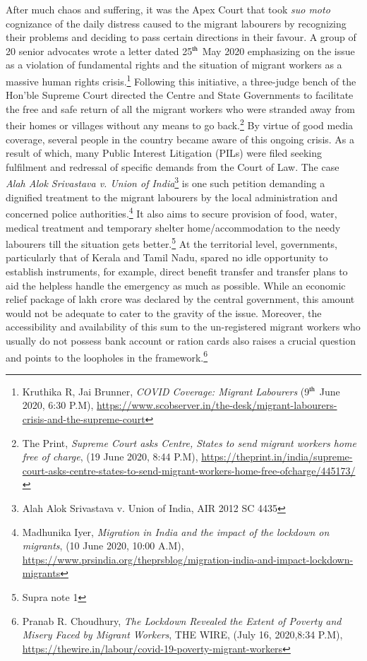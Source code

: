 \begin{multicols}{2}
\noi
After much chaos and suffering, it was the Apex Court that took \textit{suo moto} cognizance of the
daily distress caused to the migrant labourers by recognizing their problems and deciding to
pass certain directions in their favour. A group of 20 senior advocates wrote a letter dated 25$^{\rm th}$
May 2020 emphasizing on the issue as a violation of fundamental rights and the situation of
migrant workers as a massive human rights crisis.\footnote{Kruthika R, Jai Brunner, \textit{COVID Coverage: Migrant Labourers} (9$^{\rm th}$ June 2020, 6:30 P.M),
\url{https://www.scobserver.in/the-desk/migrant-labourers-crisis-and-the-supreme-court}} Following this initiative, a three-judge bench of the Hon’ble Supreme Court directed the Centre and State Governments to facilitate
the free and safe return of all the migrant workers who were stranded away from their homes
or villages without any means to go back.\footnote{The Print, \textit{Supreme Court asks Centre, States to send migrant workers home free of charge}, (19 June 2020,
8:44 P.M), \url{https://theprint.in/india/supreme-court-asks-centre-states-to-send-migrant-workers-home-free-ofcharge/445173/}} By virtue of good media coverage, several
people in the country became aware of this ongoing crisis. As a result of which, many Public
Interest Litigation (PILs) were filed seeking fulfilment and redressal of specific demands
from the Court of Law. The case \textit{Alah Alok Srivastava v. Union of India}\footnote{Alah Alok Srivastava v. Union of India, AIR 2012 SC 4435 } is one such petition
demanding a dignified treatment to the migrant labourers by the local administration and
concerned police authorities.\footnote{Madhunika Iyer, \textit{Migration in India and the impact of the lockdown on migrants}, (10 June 2020, 10:00 A.M),
\url{https://www.prsindia.org/theprsblog/migration-india-and-impact-lockdown-migrants}} It also aims to secure provision of food, water, medical
treatment and temporary shelter home/accommodation to the needy labourers till the situation
gets better.\footnote{Supra note 1} At the territorial level, governments, particularly that of Kerala and Tamil
Nadu, spared no idle opportunity to establish instruments, for example, direct benefit transfer
and transfer plans to aid the helpless handle the emergency as much as possible. While an
economic relief package of  lakh crore was declared by the central government, this
amount would not be adequate to cater to the gravity of the issue. Moreover, the accessibility
and availability of this sum to the un-registered migrant workers who usually do not possess
bank account or ration cards also raises a crucial question and points to the loopholes in the
framework.\footnote{Pranab R. Choudhury, \textit{The Lockdown Revealed the Extent of Poverty and Misery Faced by Migrant Workers},
THE WIRE, (July 16, 2020,8:34 P.M), \url{https://thewire.in/labour/covid-19-poverty-migrant-workers}}


\end{multicols}
